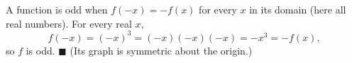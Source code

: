 A function is odd when $f(-x)=-f(x)$ for every $x$ in its domain (here all real numbers). For every real $x$,
\[
f(-x)=(-x)^3=(-x)(-x)(-x)=-x^3=-f(x),
\]
so $f$ is odd. $\blacksquare$ (Its graph is symmetric about the origin.)
